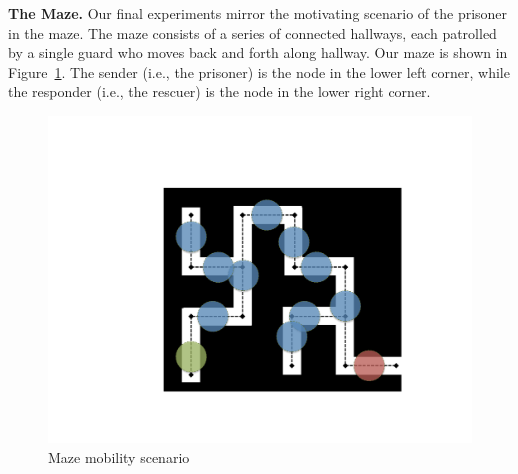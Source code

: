 {\bf The Maze.} Our final experiments mirror the motivating scenario
of the prisoner in the maze. The maze consists of a series of
connected hallways, each patrolled by a single guard who moves back
and forth along hallway. Our maze is shown in
Figure~\ref{fig:maze}. The sender (i.e., the prisoner) is the node in
the lower left corner, while the responder (i.e., the rescuer) is the
node in the lower right corner.
\begin{figure}
\begin{center}
\includegraphics[width=.75\columnwidth]{figures/newMaze.pdf}
\end{center}
\vspace{-.75cm}
\caption{Maze mobility scenario}
\label{fig:maze}
\vspace{-.25cm}
\end{figure}

